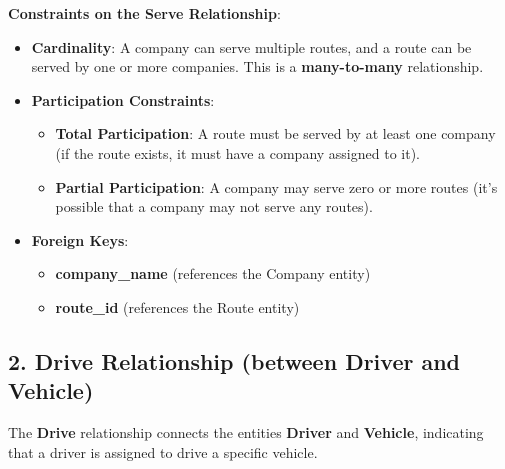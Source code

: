 \documentclass{article}
\begin{document}
\textbf{Constraints on the Serve Relationship}:
\begin{itemize}
	\item \textbf{Cardinality}: A company can serve multiple routes, and a route can be served by one or more companies. This is a \textbf{many-to-many} relationship.
	\item \textbf{Participation Constraints}:
	\begin{itemize}
		\item \textbf{Total Participation}: A route must be served by at least one company (if the route exists, it must have a company assigned to it).
		\item \textbf{Partial Participation}: A company may serve zero or more routes (it’s possible that a company may not serve any routes).
	\end{itemize}
	\item \textbf{Foreign Keys}: 
	\begin{itemize}
		\item \textbf{company\_name} (references the Company entity)
		\item \textbf{route\_id} (references the Route entity)
	\end{itemize}
\end{itemize}

\subsection*{2. Drive Relationship (between Driver and Vehicle)}
The \textbf{Drive} relationship connects the entities \textbf{Driver} and \textbf{Vehicle}, indicating that a driver is assigned to drive a specific vehicle.
\end{document}
